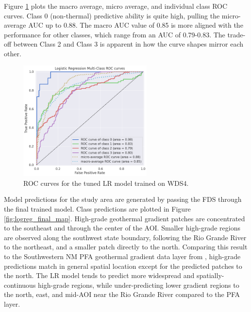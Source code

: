 Figure \ref{fig:logreg_auc} plots the macro average, micro average, and individual class ROC curves. Class 0 (non-thermal) predictive ability is quite high, pulling the micro-average AUC up to 0.88.  The macro AUC value of 0.85 is more aligned with the performance for other classes, which range from an AUC of 0.79-0.83. The trade-off between Class 2 and Class 3 is apparent in how the curve shapes mirror each other.

\begin{figure}[!htp]
\centering
\includegraphics[width=0.6\textwidth]{templates/images/Figure-LR-AUC.png}
\singlespacing
\caption[Logistic regression ROC curves]{ROC curves for the tuned LR model trained on WDS4.}
\label{fig:logreg_auc}
\end{figure}

Model predictions for the study area are generated by passing the FDS through the final trained model. Class predictions are plotted in Figure \ref{fig:logreg_final_map}. High-grade geothermal gradient patches are concentrated to the southeast and through the center of the AOI. Smaller high-grade regions are observed along the southwest state boundary, following the Rio Grande River to the northeast, and a smaller patch directly to the north.  Comparing this result to the Southwestern NM PFA geothermal gradient data layer from \citet{bielicki_hydrogeolgic_2015}, high-grade predictions match in general spatial location except for the predicted patches to the north. The LR model tends to predict more widespread and spatially-continuous high-grade regions, while under-predicting lower gradient regions to the north, east, and mid-AOI near the Rio Grande River compared to the PFA layer.

